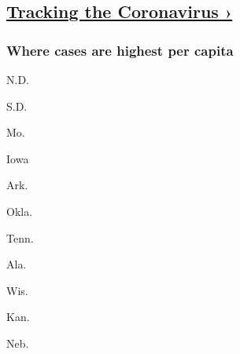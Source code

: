 \hypertarget{tracking-the-coronavirus-}{%
\subsection{\texorpdfstring{\href{https://www.nytimes3xbfgragh.onion/interactive/2020/us/coronavirus-us-cases.html}{Tracking
the Coronavirus
›}}{Tracking the Coronavirus ›}}\label{tracking-the-coronavirus-}}

\href{https://www.nytimes3xbfgragh.onion/interactive/2020/us/coronavirus-us-cases.html}{}

\hypertarget{where-cases-are-highest-per-capita}{%
\subsubsection{\texorpdfstring{Where cases are \textbf{highest} per
capita}{Where cases are highest per capita}}\label{where-cases-are-highest-per-capita}}

\href{https://www.nytimes3xbfgragh.onion/interactive/2020/us/north-dakota-coronavirus-cases.html}{}

N.D.
\href{https://www.nytimes3xbfgragh.onion/interactive/2020/us/south-dakota-coronavirus-cases.html}{}

S.D.
\href{https://www.nytimes3xbfgragh.onion/interactive/2020/us/missouri-coronavirus-cases.html}{}

Mo.
\href{https://www.nytimes3xbfgragh.onion/interactive/2020/us/iowa-coronavirus-cases.html}{}

Iowa
\href{https://www.nytimes3xbfgragh.onion/interactive/2020/us/arkansas-coronavirus-cases.html}{}

Ark.
\href{https://www.nytimes3xbfgragh.onion/interactive/2020/us/oklahoma-coronavirus-cases.html}{}

Okla.
\href{https://www.nytimes3xbfgragh.onion/interactive/2020/us/tennessee-coronavirus-cases.html}{}

Tenn.
\href{https://www.nytimes3xbfgragh.onion/interactive/2020/us/alabama-coronavirus-cases.html}{}

Ala.
\href{https://www.nytimes3xbfgragh.onion/interactive/2020/us/wisconsin-coronavirus-cases.html}{}

Wis.
\href{https://www.nytimes3xbfgragh.onion/interactive/2020/us/kansas-coronavirus-cases.html}{}

Kan.
\href{https://www.nytimes3xbfgragh.onion/interactive/2020/us/nebraska-coronavirus-cases.html}{}

Neb.
\href{https://www.nytimes3xbfgragh.onion/interactive/2020/us/south-carolina-coronavirus-cases.html}{}

